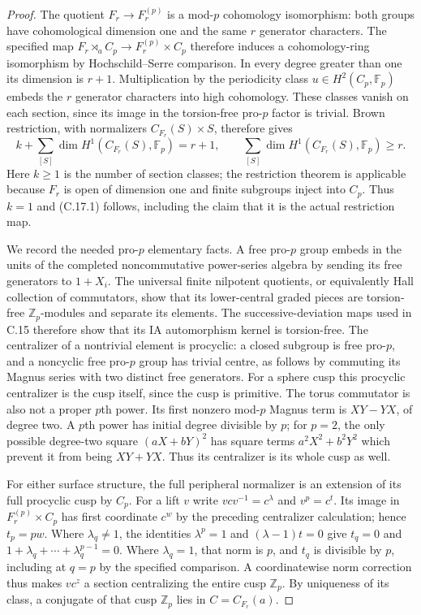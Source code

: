 \begin{proof}
The quotient $F_r\to F_r^{(p)}$ is a mod-$p$ cohomology
isomorphism: both groups have cohomological dimension
one and the same $r$ generator characters.  The specified
map $F_r\rtimes_a C_p\to F_r^{(p)}\times C_p$ therefore
induces a cohomology-ring isomorphism by
Hochschild--Serre comparison.  In every degree greater
than one its dimension is $r+1$.  Multiplication by the
periodicity class $u\in H^2(C_p,\mathbb F_p)$ embeds the
$r$ generator characters into high cohomology.  These
classes vanish on each section, since its image in the
torsion-free pro-$p$ factor is trivial.
Brown restriction, with normalizers $C_{F_r}(S)\times S$,
therefore gives
\[
 k+\sum_{[S]}\dim H^1(C_{F_r}(S),\mathbb F_p)=r+1,
 \qquad \sum_{[S]}\dim H^1(C_{F_r}(S),\mathbb F_p)\geq r.
\]
Here $k\geq1$ is the number of section classes; the
restriction theorem is applicable because $F_r$ is open
of dimension one and finite subgroups inject into $C_p$.
Thus $k=1$ and (C.17.1) follows, including the claim that
it is the actual restriction map.

We record the needed pro-$p$ elementary facts.  A free
pro-$p$ group embeds in the units of the completed
noncommutative power-series algebra by sending its free
generators to $1+X_i$.  The universal finite nilpotent
quotients, or equivalently Hall collection of commutators,
show that its lower-central graded pieces are torsion-free
$\mathbb Z_p$-modules and separate its elements.  The
successive-deviation maps used in C.15 therefore show
that its IA automorphism kernel is torsion-free.  The
centralizer of a nontrivial element is procyclic: a closed
subgroup is free pro-$p$, and a noncyclic free pro-$p$
group has trivial centre, as follows by commuting its
Magnus series with two distinct free generators.  For a
sphere cusp this procyclic centralizer is the cusp itself,
since the cusp is primitive.  The torus commutator is
also not a proper $p$th power.  Its first nonzero mod-$p$
Magnus term is $XY-YX$, of degree two.  A $p$th power
has initial degree divisible by $p$; for $p=2$, the
only possible degree-two square $(aX+bY)^2$ has square
terms $a^2X^2+b^2Y^2$ which prevent it from being
$XY+YX$.  Thus its centralizer is its whole cusp as well.

For either surface structure, the full peripheral
normalizer is an extension of its full procyclic cusp
by $C_p$.  For a lift $v$ write
$v c v^{-1}=c^\lambda$ and $v^p=c^t$.
Its image in $F_r^{(p)}\times C_p$ has first coordinate
$c^w$ by the preceding centralizer calculation; hence
$t_p=pw$.  Where $\lambda_q\ne1$, the identities
$\lambda^p=1$ and $(\lambda-1)t=0$ give $t_q=0$ and
$1+\lambda_q+\cdots+\lambda_q^{p-1}=0$.  Where
$\lambda_q=1$, that norm is $p$, and $t_q$ is divisible
by $p$, including at $q=p$ by the specified comparison.
A coordinatewise norm correction thus makes $vc^z$ a
section centralizing the entire cusp $\mathbb Z_p$.
By uniqueness of its class, a conjugate of that cusp
$\mathbb Z_p$ lies in $C=C_{F_r}(a)$.


\end{proof}
